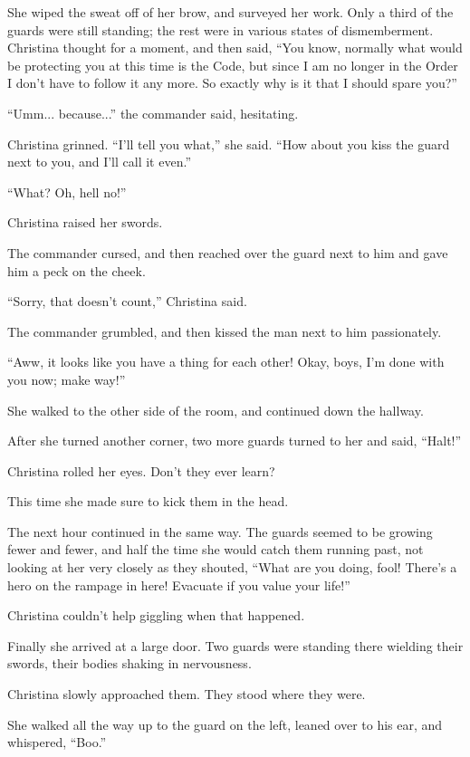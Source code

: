 \documentclass[showtrims,b6paper,draft,10pt]{memoir}
\begin{document}
She wiped the sweat off of her brow, and surveyed her work.  Only a third of the guards were still standing;  the rest were in various states of dismemberment.  Christina thought for a moment, and then said,  ``You know, normally what would be protecting you at this time is the Code, but since I am no longer in the Order I don't have to follow it any more.  So exactly why is it that I should spare you?''

``Umm... because...'' the commander said, hesitating.

Christina grinned.  ``I'll tell you what,'' she said.  ``How about you kiss the guard next to you, and I'll call it even.''

``What?  Oh, hell no!''

Christina raised her swords.

The commander cursed, and then reached over the guard next to him and gave him a peck on the cheek.

``Sorry, that doesn't count,'' Christina said.

The commander grumbled, and then kissed the man next to him passionately.

``Aww, it looks like you have a thing for each other!  Okay,  boys, I'm done with you now; make way!''

She walked to the other side of the room, and continued down the hallway.

After she turned another corner, two more guards turned to her and said, ``Halt!''

Christina rolled her eyes.  Don't they ever learn?

This time she made sure to kick them in the head.

\timeskip
The next hour continued in the same way.  The guards seemed to be growing fewer and fewer, and half the time she would catch them running past, not looking at her very closely as they shouted, ``What are you doing, fool!  There's a hero on the rampage in here!  Evacuate if you value your life!''

Christina couldn't help giggling when that happened.

Finally she arrived at a large door.  Two guards were standing there wielding their swords, their bodies shaking in nervousness.

Christina slowly approached them.  They stood where they were.

She walked all the way up to the guard on the left, leaned over to his ear, and whispered, ``Boo.''
\end{document}
